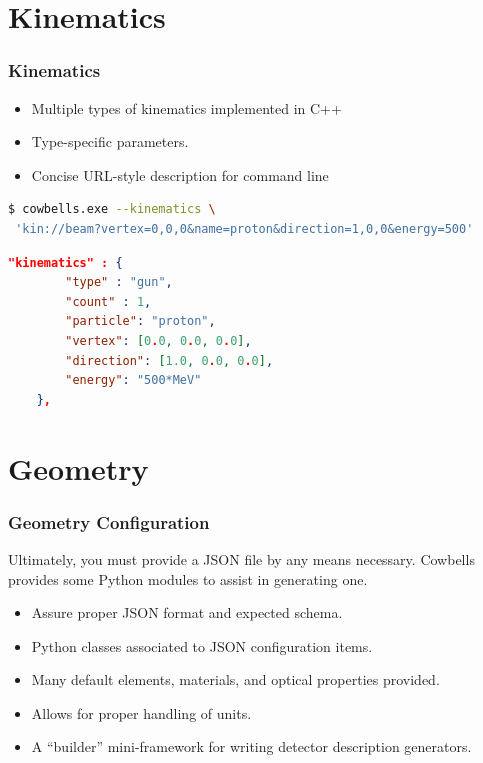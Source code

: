 \documentclass[xcolor=dvipsnames]{beamer}
\begin{document}
\section{Kinematics}

\begin{frame}[fragile]
  \frametitle{Kinematics}
  \begin{itemize}
  \item Multiple types of kinematics implemented in C++
  \item Type-specific parameters.
  \item Concise URL-style description for command line
  \end{itemize}

  \begin{lstlisting}[language=sh]
$ cowbells.exe --kinematics \
 'kin://beam?vertex=0,0,0&name=proton&direction=1,0,0&energy=500'
  \end{lstlisting}

  \begin{lstlisting}[language=json]
    "kinematics" : {
        "type" : "gun",
        "count" : 1,
        "particle": "proton",
        "vertex": [0.0, 0.0, 0.0],
        "direction": [1.0, 0.0, 0.0],
        "energy": "500*MeV"
    },
  \end{lstlisting}

\end{frame}

\section{Geometry}

\begin{frame}
  \frametitle{Geometry Configuration}

  Ultimately, you must provide a JSON file by any means necessary.
  Cowbells provides some Python modules to assist in generating one.
  \begin{itemize}
  \item Assure proper JSON format and expected schema.
  \item Python classes associated to JSON configuration items.
  \item Many default elements, materials, and optical properties provided.
  \item Allows for proper handling of units.
  \item A ``builder'' mini-framework for writing detector description generators.
  \end{itemize}
\end{frame}
\end{document}
